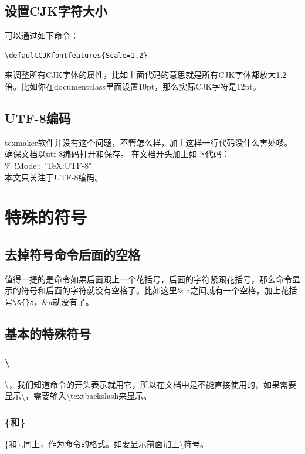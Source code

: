 \documentclass[12pt,oneside]{book}
\begin{document}
\begin{common-format}
\subsection{设置CJK字符大小}
可以通过如下命令：
\begin{Verbatim}
\defaultCJKfontfeatures{Scale=1.2}   
\end{Verbatim}
来调整所有CJK字体的属性，比如上面代码的意思就是所有CJK字体都放大1.2倍。比如你在documentclass里面设置10pt，那么实际CJK字符是12pt。



\subsection{UTF-8编码}
texmaker软件并没有这个问题，不管怎么样，加上这样一行代码没什么害处喽。确保文档以utf-8编码打开和保存。
在文档开头加上如下代码：\\
\% !Mode:: "TeX:UTF-8" \\
本文只关注于UTF-8编码。


\section{特殊的符号}
\label{sec:symbols}
\subsection{去掉符号命令后面的空格}
值得一提的是命令如果后面跟上一个花括号，后面的字符紧跟花括号，那么命令显示的符号和后面的字符就没有空格了。比如这里\& a之间就有一个空格，加上花括号\verb+\&{}a+，\&{}a就没有了。

\subsection{基本的特殊符号}
\subsubsection{\textbackslash}
\textbackslash ，我们知道命令的开头表示就用它，所以在文档中是不能直接使用的，如果需要显示\textbackslash ，需要输入\textbackslash textbackslash来显示。

\subsubsection{\{和\}}
\{和\},同上，作为命令的格式。如要显示前面加上\textbackslash 符号。


\end{common-format}
\end{document}
